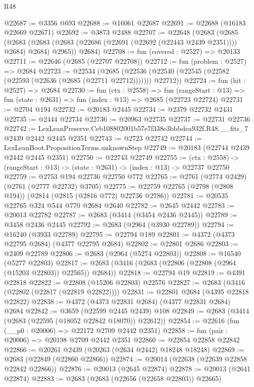 \begin{lexlean}{R48}
\begin{coremodule}
@22687 := @3356 @693
@22688 := @16061 @22687
@22691 := @22688 (@16183 @22669 @22671)
@22692 := @3873 @2488
@22707 := @22648
    (@2683
      (@2685
        (@2683 (@2683 (@2683 (@22686 (@22691 (@22692 (@22443 @2439 @2351)))) @2684) @2684) @2965))
      @2684)
@22708 := fun (covered : @2527) => @20133
@22711 := @22646 (@2685 (@22707 @22708))
@22712 := fun (problem : @2527) => @2684
@22723 := @22534
    (@2685 (@22536 (@22540 (@22545 (@22582 (@22593 (@22636 (@2685 (@22711 @22712))))))) @22712))
@22724 := fun (hit : @2527) => @2684
@22730 := fun (ctx : @2558) =>
  fun (rangeStart : @13) => fun (state : @2631) => fun (index : @13) => @2685 (@22723 @22724)
@22731 := @2704 @194
@22732 := @20183 @2445
@22734 := @2379 @22732 @2431
@22735 := @2444 @22734
@22736 := @20963 @22735
@22737 := @22731 @22736
@22742 := LexLeanPreserve.Ceb108802001b57e7f338e3bbbdea932f.R48.__fits_7 @2439 @2442 @2445 @2351
@22743 := @2723 @22742
@22744 := LexLeanBoot.PropositionTerms.unknownStep
@22749 := @20183 (@22744 @2439 @2442 @2445 @2351)
@22750 := @22743 @22749
@22755 := (ctx : @2558) -> (rangeStart : @13) -> (state : @2631) -> (index : @13) -> @22737 @22750
@22759 := @2753 @194 @22736 @22750 @772
@22765 := @2761 (@2774 @2429) (@2761 (@2777 @22732) @3705)
@22775 := @22759 @22765 (@2798 (@2808 @194)) (@2814 (@2815 (@2816 @772) @22736 @2786))
@22781 := @20535 @22765 @324 @544 @770 @2684 @2640
@22782 := @2645 @2442
@22783 := @20013 @22782
@22787 := @2683 (@3414 (@3454 @2436 @2445))
@22789 := @3458 @2436 @2445
@22792 := @2683 (@2964 (@3930 @22789))
@22794 := @16240 (@3933 @22789)
@22795 := @22794 @189
@22801 := @4372 (@4373 @22795 @2684) (@4377 @22795 @2684)
@22802 := @22801 @2686
@22803 := @2409 @22789
@22806 := @2683 (@2964 (@5274 @22803))
@22808 := @16540 (@5277 @22803)
@22817 := @2683 (@3416 (@2683 (@22806 (@22808 (@2964 (@15203 @22803)) @22565)) @2684))
@22818 := @22794 @19
@22819 := @4391 @22818
@22822 := @22808 (@15206 @22803) @22576
@22827 := @2683 (@3416 (@22802 (@22817 (@22819 @22822))))
@22831 := @22801 @2684 (@4395 @22818 @22822)
@22838 := @4372 (@4373 @22831 @2684) (@4377 @22831 @2684) @2684
@22842 := @3659 (@22599 @2445 @2439) @108
@22849 := @2683 (@3414 (@2683 (@22595 (@18052 @22842 @18070)) @22612))
@22854 := @22616 (fun (__p0 : @20006) => @22172 @2709 @2442 @2351)
@22858 := fun (pair : @20006) => @20198 @2709 @2442 @2351
@22860 := @22854 @22858 @22842
@22866 := @20261 @2439 (@20263 (@2634 @2442) @18248 @18248)
@22869 := @2683 (@22849 (@22860 @22866))
@22874 := @20014 (@22638 (@22639 @22858 @22842 @22866))
@22876 := @20013 (@2645 @22874)
@22878 := @20013 (@2641 @22874)
@22883 := @2683 (@2683 (@22656 (@22658 @22803)) @22665)

\end{coremodule}
\end{lexlean}
